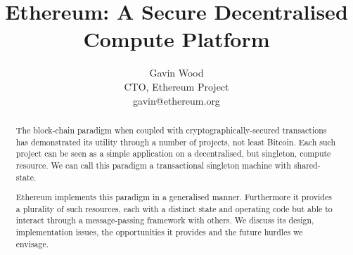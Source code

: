 \documentclass[9pt,oneside]{amsart}
\title{Ethereum: A Secure Decentralised Compute Platform}
\author{
    Gavin Wood\\
    CTO, Ethereum Project\\
    gavin@ethereum.org
}
\begin{document}
\begin{abstract}
The block-chain paradigm when coupled with cryptographically-secured transactions has demonstrated its utility through a number of projects, not least Bitcoin. Each such project can be seen as a simple application on a decentralised, but singleton, compute resource. We can call this paradigm a transactional singleton machine with shared-state.

Ethereum implements this paradigm in a generalised manner. Furthermore it provides a plurality of such resources, each with a distinct state and operating code but able to interact through a message-passing framework with others. We discuss its design, implementation issues, the opportunities it provides and the future hurdles we envisage.
\end{abstract}

\maketitle
\end{document}
